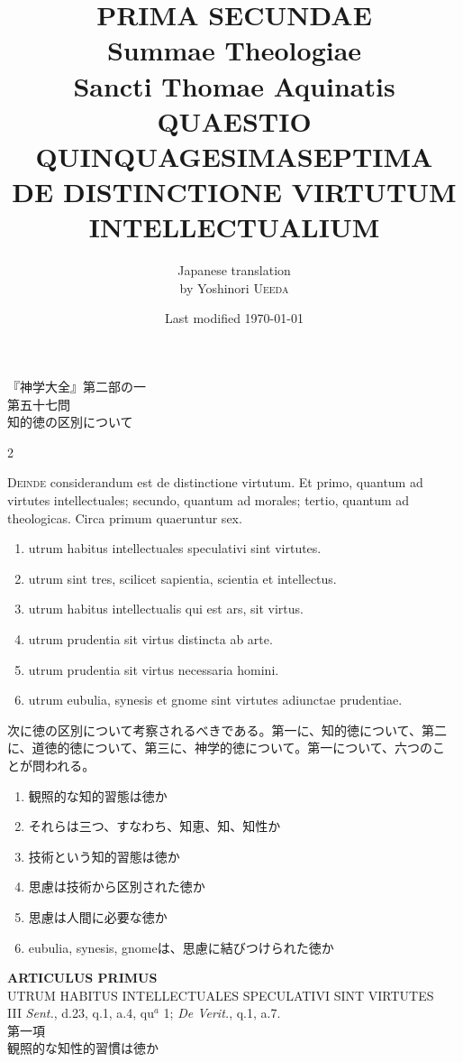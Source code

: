 \documentclass[paper=a4paper,fontsize=10pt,jafontsize=9pt,titlepage]{jlreq}
\title{{\bfseries PRIMA SECUNDAE}\\{\Huge Summae Theologiae}\\Sancti Thomae
Aquinatis\\{\sffamily QUAESTIO QUINQUAGESIMASEPTIMA}\\DE DISTINCTIONE
VIRTUTUM INTELLECTUALIUM}
\author{Japanese translation\\by Yoshinori {\scshape Ueeda}}
\date{Last modified \today}
\begin{document}
\maketitle

\begin{center}
{\LARGE 『神学大全』第二部の一}\\
{\Large 第五十七問\\知的徳の区別について}
\end{center}
\newpage

\begin{paracol}{2}

{\scshape {\Large D}einde} considerandum est de distinctione virtutum. Et
 primo, quantum ad virtutes intellectuales; secundo, quantum ad
 morales; tertio, quantum ad theologicas. Circa primum quaeruntur sex.

\begin{enumerate}
 \item utrum habitus intellectuales speculativi sint virtutes.
 \item utrum sint tres, scilicet sapientia, scientia et intellectus.
 \item utrum habitus intellectualis qui est ars, sit virtus.
 \item utrum prudentia sit virtus distincta ab arte.
 \item utrum prudentia sit virtus necessaria homini.
 \item utrum eubulia, synesis et gnome sint virtutes adiunctae
 prudentiae.
\end{enumerate}

\switchcolumn

次に徳の区別について考察されるべきである。第一に、知的徳について、第二
に、道徳的徳について、第三に、神学的徳について。第一について、六つのこ
とが問われる。
\begin{enumerate}
 \item 観照的な知的習態は徳か
 \item それらは三つ、すなわち、知恵、知、知性か
 \item 技術という知的習態は徳か
 \item 思慮は技術から区別された徳か
 \item 思慮は人間に必要な徳か
 \item eubulia, synesis, gnomeは、思慮に結びつけられた徳か
\end{enumerate}

\end{paracol}
\newpage
{}
{}
\setcounter{section}{1}
\setcounter{subsection}{0}
\begin{center}
{\Large {\bfseries ARTICULUS PRIMUS}}\\ {\large UTRUM HABITUS
INTELLECTUALES SPECULATIVI SINT VIRTUTES}\\ {\footnotesize III
{\itshape Sent.}, d.23, q.1, a.4, qu$^a$ 1; {\itshape De Verit.}, q.1,
a.7.}\\ {\Large 第一項\\観照的な知性的習慣は徳か }
\end{center}
\end{document}
